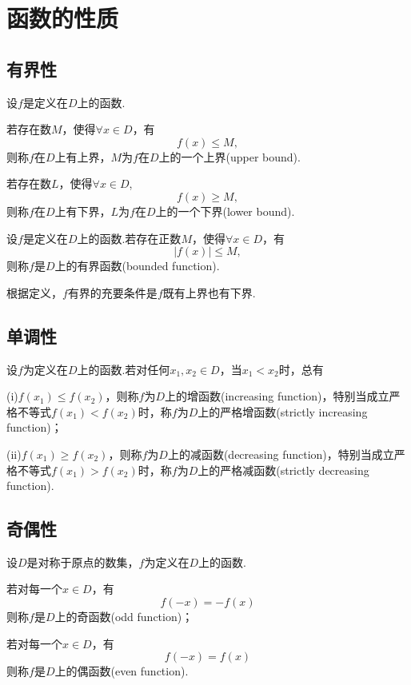\section{函数的性质}
\subsection{有界性}
\begin{definition}[上界和下界]
	设$f$是定义在$D$上的函数.
	
	若存在数$M$，使得$\forall x\in D$，有
	$$f(x)\leqslant M,$$
	则称$f$在$D$上有上界，$M$为$f$在$D$上的一个{\heiti 上界}(upper bound).
	
	若存在数$L$，使得$\forall x\in D$,
	$$f(x)\geqslant M,$$
	则称$f$在$D$上有下界，$L$为$f$在$D$上的一个{\heiti 下界}(lower bound).
\end{definition}
\begin{definition}[有界函数]
	设$f$是定义在$D$上的函数.若存在正数$M$，使得$\forall x\in D$，有
	$$|f(x)|\leqslant M,$$
	则称$f$是$D$上的{\heiti 有界函数}(bounded function).
\end{definition}
根据定义，$f$有界的充要条件是$f$既有上界也有下界.
\subsection{单调性}
\begin{definition}[单调函数]
	设$f$为定义在$D$上的函数.若对任何$x_1,x_2\in D$，当$x_1<x_2$时，总有
	
	(i)$f(x_1)\leqslant f(x_2)$，则称$f$为$D$上的{\heiti 增函数}(increasing function)，特别当成立严格不等式$f(x_1)<f(x_2)$时，称$f$为$D$上的{\heiti 严格增函数}(strictly increasing function)；
	
	(ii)$f(x_1)\geqslant f(x_2)$，则称$f$为$D$上的{\heiti 减函数}(decreasing function)，特别当成立严格不等式$f(x_1)>f(x_2)$时，称$f$为$D$上的{\heiti 严格减函数}(strictly decreasing function).
\end{definition}
\subsection{奇偶性}
\begin{definition}[奇偶函数]
	设$D$是对称于原点的数集，$f$为定义在$D$上的函数.
	
	若对每一个$x\in D$，有
	$$f(-x)=-f(x)$$
	则称$f$是$D$上的{\heiti 奇函数}(odd function)；
	
	若对每一个$x\in D$，有
	$$f(-x)=f(x)$$
	则称$f$是$D$上的{\heiti 偶函数}(even function).
\end{definition}
